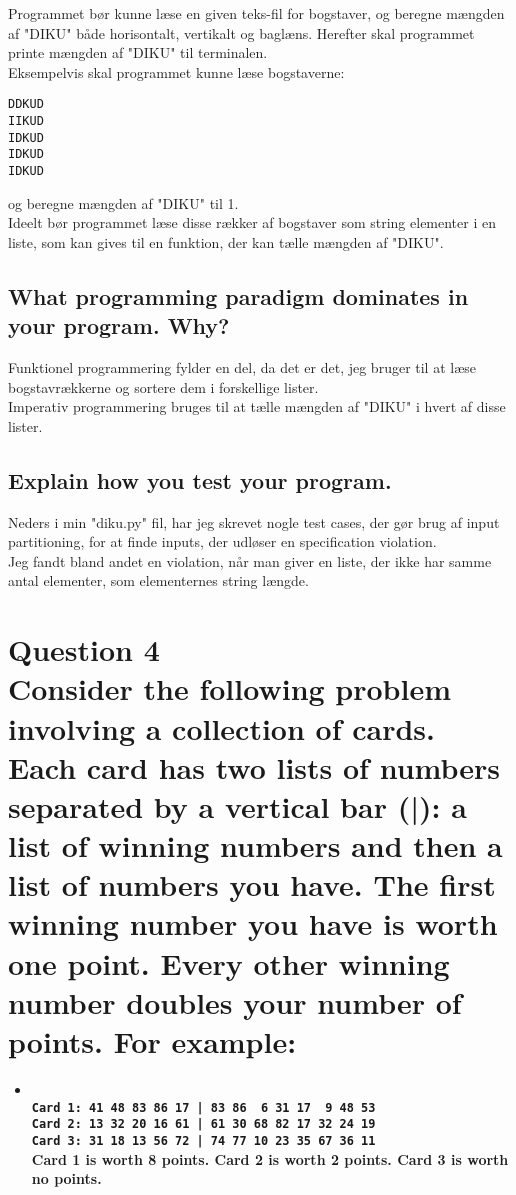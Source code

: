 \documentclass[a4paper,12pt]{article}
\begin{document}
Programmet bør kunne læse en given teks-fil for bogstaver, og beregne mængden af "DIKU" både horisontalt, vertikalt og baglæns. Herefter skal programmet printe mængden af "DIKU" til terminalen.\\
Eksempelvis skal programmet kunne læse bogstaverne:
\begin{lstlisting}
DDKUD
IIKUD
IDKUD
IDKUD
IDKUD
\end{lstlisting}
og beregne mængden af "DIKU" til 1.\\
Ideelt bør programmet læse disse rækker af bogstaver som string elementer i en liste, som kan gives til en funktion, der kan tælle mængden af "DIKU".\\

\subsection[What programming paradigm dominates in your program]{What programming paradigm dominates in your program. Why?}

Funktionel programmering fylder en del, da det er det, jeg bruger til at læse bogstavrækkerne og sortere dem i forskellige lister.\\
Imperativ programmering bruges til at tælle mængden af "DIKU" i hvert af disse lister.

\subsection[Explain how you test your program]{Explain how you test your program.}

Neders i min "diku.py" fil, har jeg skrevet nogle test cases, der gør brug af input partitioning, for at finde inputs, der udløser en specification violation.\\
Jeg fandt bland andet en violation, når man giver en liste, der ikke har samme antal elementer, som elementernes string længde.

\section[Question 4 - Cards]{Question 4\\
Consider the following problem involving a collection of cards.
Each card has two lists of numbers separated by a vertical bar (|): a list of winning numbers and then a list of numbers you have.
The first winning number you have is worth one point. Every other winning number doubles your number of points.
For example:}
\begin{itemize}
    \item[] \textbf{\\
    \lstinline{Card 1: 41 48 83 86 17 | 83 86  6 31 17  9 48 53}\\
    \lstinline{Card 2: 13 32 20 16 61 | 61 30 68 82 17 32 24 19}\\
    \lstinline{Card 3: 31 18 13 56 72 | 74 77 10 23 35 67 36 11}\\
    Card 1 is worth 8 points. Card 2 is worth 2 points. Card 3 is worth no points.}
\end{itemize}
\end{document}
